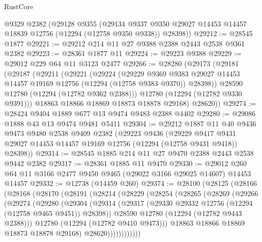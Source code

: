 \begin{lexlean}{RustCore}
\begin{coremodule}
    @9329
    @2382
    (@29128
      @9355
      (@29134 @9337 @9350 @29027 @14453 @14457 @18839 @12756 (@12294 (@12758 @9350 @9338)) @28398))
@29212 := @28545 @1877
@29221 := @29212 @214 @11 @27 @9388 @2388 @2443 @2538 @9361 @2382
@29223 := @28361 @1877 @11
@29224 := @29223 @9388
@29229 := @29012 @229 @64 @11 @3123 @2477
@29266 := @28280
    (@29173
      (@29181
        (@29187
          (@29211
            (@29221
              (@29224
                (@29229
                  @9369
                  @9383
                  @29027
                  @14453
                  @14457
                  @19169
                  @12756
                  (@12294 (@12758 @9383 @9370))
                  @28398))
              @28590
              @12780
              (@12294 (@12782 @9362 @2388)))
            @12780
            (@12294 (@12782 @9330 @9391)))
          @18863
          @18866
          @18869
          @18873
          @18878
          @29168)
        @28620))
@29274 := @28424 @9404 @1889 @677 @13 @9474 @9483 @2388 @4402
@29280 := @29086 @1888 @43 @13 @9474 @9481 @5411
@29304 := @29212
    @1887
    @11
    @40
    @9436
    @9473
    @9480
    @2538
    @9409
    @2382
    (@29223
      @9436
      (@29229 @9417 @9431 @29027 @14453 @14457 @19169 @12756 (@12294 (@12758 @9431 @9418)) @28398))
@29314 := @28545 @1885 @214 @11 @27 @9470 @2388 @2443 @2538 @9442 @2382
@29317 := @28361 @1885 @11 @9470
@29330 := @29012 @260 @64 @11 @3166 @2477 @9450 @9465 (@29022 @3166 @29025 @14607) @14453 @14457
@29332 := @12738 (@14459 @260)
@29374 := @28100
    (@28125
      (@28166
        (@28168
          (@28170
            (@28191
              (@28214
                (@28229
                  (@28254
                    (@28265
                      (@28269
                        (@29266
                          (@29274
                            (@29280
                              (@29304
                                (@29314
                                  (@29317
                                    (@29330 @29332 @12756 (@12294 (@12758 @9465 @9451)) @28398))
                                  @28590
                                  @12780
                                  (@12294 (@12782 @9443 @2388)))
                                @12780
                                (@12294 (@12782 @9410 @9473)))
                              @18863
                              @18866
                              @18869
                              @18873
                              @18878
                              @29168)
                            @28620))))))))))))

\end{coremodule}
\end{lexlean}
